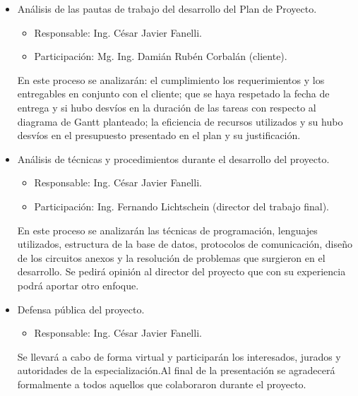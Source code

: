\documentclass[
11pt, %
]{charter}
\begin{document}
\begin{itemize}
	\item Análisis de las pautas de trabajo del desarrollo del Plan de Proyecto.
	\begin{itemize}	
		\item Responsable: Ing. César Javier Fanelli.
		\item Participación: Mg. Ing. Damián Rubén Corbalán (cliente).
	\end{itemize}	
	En este proceso se analizarán: el cumplimiento los requerimientos y los entregables en conjunto con el cliente; que se haya respetado la fecha de entrega y si hubo desvíos en la duración de las tareas con respecto al diagrama de Gantt planteado; la eficiencia de recursos utilizados y su hubo desvíos en el presupuesto presentado en el plan y su justificación.
	\item Análisis de técnicas y procedimientos durante el desarrollo del proyecto.
	\begin{itemize}	
		\item Responsable: Ing. César Javier Fanelli.
		\item Participación: Ing. Fernando Lichtschein (director del trabajo final).
	\end{itemize}
	En este proceso se analizarán las técnicas de programación, lenguajes utilizados, estructura de la base de datos, protocolos de comunicación, diseño de los circuitos anexos y la resolución de problemas que surgieron en el desarrollo. Se pedirá opinión al director del proyecto que con su experiencia podrá aportar otro enfoque.
	\item Defensa pública del proyecto.
	\begin{itemize}	
		\item Responsable: Ing. César Javier Fanelli.
	\end{itemize}
	Se llevará a cabo de forma virtual y participarán los interesados, jurados y autoridades de la especialización.Al final de la presentación se agradecerá formalmente a todos aquellos que
colaboraron durante el proyecto.
\end{itemize}
\end{document}
